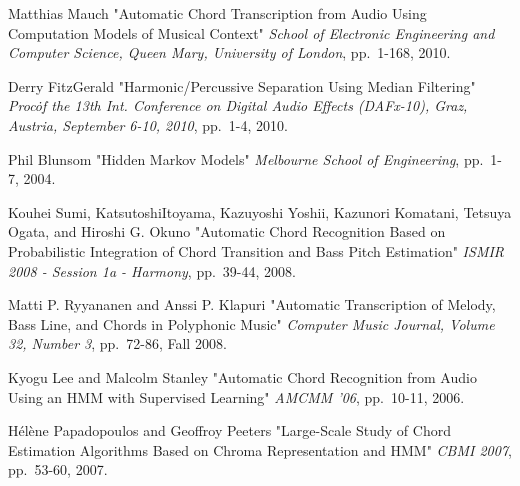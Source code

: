 \documentclass{article}
\begin{document}
\begin{thebibliography}{citations}
Matthias Mauch
"Automatic Chord Transcription from Audio Using Computation Models of Musical Context"
{\it School of Electronic Engineering and Computer Science, Queen Mary, University of London},
pp.~1-168, 2010.

Derry FitzGerald
"Harmonic/Percussive Separation Using Median Filtering"
{\it Proc\. of the 13th Int. Conference on Digital Audio Effects (DAFx-10), Graz, Austria, September 6-10, 2010},
pp.~1-4, 2010.

Phil Blunsom
"Hidden Markov Models"
{\it Melbourne School of Engineering},
pp.~1-7, 2004.

Kouhei Sumi, KatsutoshiItoyama, Kazuyoshi Yoshii, Kazunori Komatani, Tetsuya Ogata, and Hiroshi G. Okuno
"Automatic Chord Recognition Based on Probabilistic Integration of Chord Transition and Bass Pitch Estimation"
{\it ISMIR 2008 - Session 1a - Harmony},
pp.~39-44, 2008.

Matti P. Ryyananen and Anssi P. Klapuri
"Automatic Transcription of Melody, Bass Line, and Chords in Polyphonic Music"
{\it Computer Music Journal, Volume 32, Number 3},
pp.~72-86, Fall 2008.

Kyogu Lee and Malcolm Stanley
"Automatic Chord Recognition from Audio Using an HMM with Supervised Learning"
{\it AMCMM '06},
pp.~10-11, 2006.

Hélène Papadopoulos and Geoffroy Peeters
"Large-Scale Study of Chord Estimation Algorithms Based on Chroma Representation and HMM"
{\it CBMI 2007},
pp.~53-60, 2007.

\end{thebibliography}

%
\end{document}
